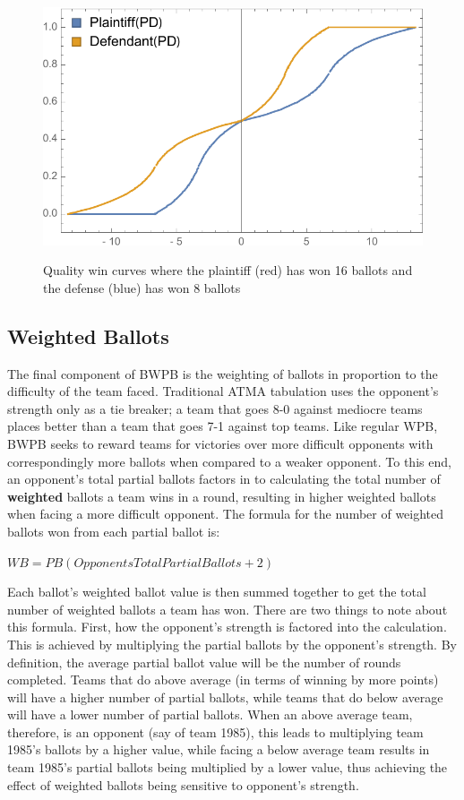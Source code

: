 \documentclass{article}
\begin{document}
\begin{figure}[h]
\begin{center}
\label{balancingCurve}
\includegraphics{BalancingCurve}
\caption{Quality win curves where the plaintiff (red) has won 16 ballots and the defense (blue) has won 8 ballots}
\end{center}
\end{figure}

\subsection{Weighted Ballots}
The final component of BWPB is the weighting of ballots in proportion to the difficulty of the team faced.  Traditional ATMA tabulation uses the opponent's strength only as a tie breaker; a team that goes 8-0 against mediocre teams places better than a team that goes 7-1 against top teams.  Like regular WPB, BWPB seeks to reward teams for victories over more difficult opponents with correspondingly more ballots when compared to a weaker opponent.  To this end, an opponent's total partial ballots factors in to calculating the total number of \textbf{weighted} ballots a team wins in a round, resulting in higher weighted ballots when facing a more difficult opponent.  The formula for the number of weighted ballots won from each partial ballot is:
\begin{center}
$WB=PB\left(OpponentsTotalPartialBallots+2\right)$
\end{center}

Each ballot's weighted ballot value is then summed together to get the total number of weighted ballots a team has won.  There are two things to note about this formula.  First, how the opponent's strength is factored into the calculation.  This is achieved by multiplying the partial ballots by the opponent's strength.  By definition, the average partial ballot value will be the number of rounds completed.  Teams that do above average (in terms of winning by more points) will have a higher number of partial ballots, while teams that do below average will have a lower number of partial ballots.  When an above average team, therefore, is an opponent (say of team 1985), this leads to multiplying team 1985's ballots by a higher value, while facing a below average team results in team 1985's partial ballots being multiplied by a lower value, thus achieving the effect of weighted ballots being sensitive to opponent's strength.
\end{document}
